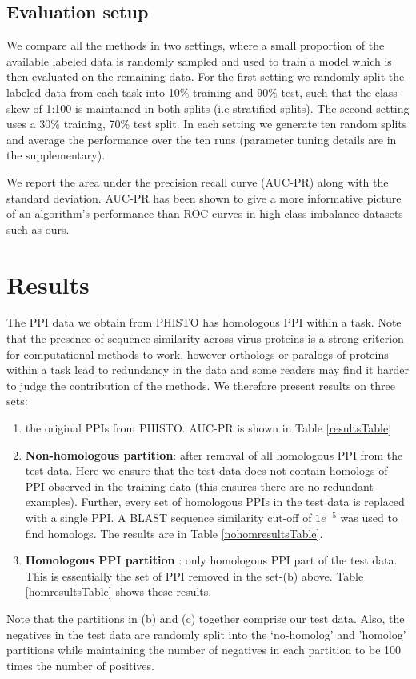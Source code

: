 \documentclass{bioinfo}
\begin{document}
\subsection{Evaluation setup}
We compare all the methods in two settings, where a small proportion of the available labeled data is randomly sampled and used to train a model which is then evaluated on the remaining data. For the first setting we randomly split the labeled data from each task into 10\% training and 90\% test, such that the class-skew of 1:100 is maintained in both splits (i.e stratified splits). The second setting uses a 30\% training, 70\% test split. 
In each setting we generate ten random splits and average the performance over the ten runs (parameter tuning details are in the supplementary).

We report the area under the precision recall curve (AUC-PR) along with the standard deviation. 
AUC-PR has been shown to give a more informative picture of an algorithm's performance than ROC curves in high class imbalance datasets \citep{davis2006} such as ours. 




\section{Results}
The PPI data we obtain from PHISTO has homologous PPI within a task. Note that the presence of sequence similarity across virus proteins is a strong criterion for computational methods to work, however orthologs or paralogs of proteins within a task lead to redundancy in the data and some readers may find it harder to judge the contribution of the methods. We therefore present results on three sets: 
\begin{enumerate}[a]
\item the original PPIs from PHISTO. AUC-PR is shown in Table \ref{resultsTable}
\item \textbf{Non-homologous partition}: after removal of all homologous PPI from the test data. Here we ensure that the test data does not contain homologs of PPI observed in the training data (this ensures there are no redundant examples). Further, every set of homologous PPIs in the test data is replaced with a single PPI. A BLAST sequence similarity cut-off of $1e^{-5}$ was used to find homologs. The results are in Table \ref{nohomresultsTable}.
\item \textbf{Homologous PPI partition} : only homologous PPI part of the test data. This is essentially the set of PPI removed in the set-(b) above. Table \ref{homresultsTable} shows these results. 
\end{enumerate}
Note that the partitions in (b) and (c) together comprise our test data. Also, the negatives in the test data are randomly split into the `no-homolog' and 'homolog' partitions while maintaining the number of negatives in each partition to be 100 times the number of positives. 
\end{document}
